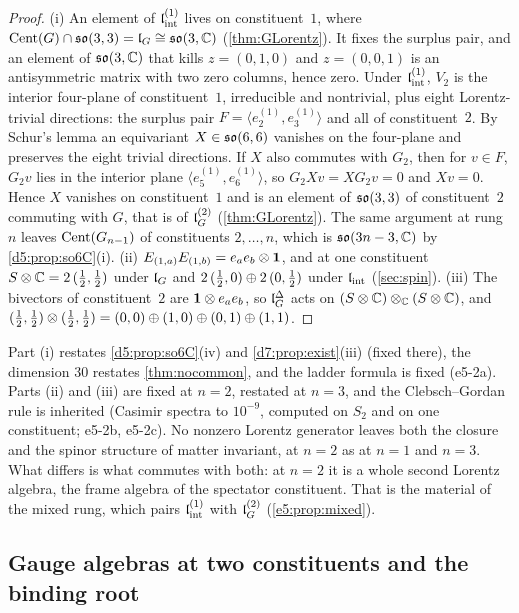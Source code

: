 \begin{proof}
(i) An element of $\mathfrak l_{\rm int}^{(1)}$ lives on constituent~$1$, where $\operatorname{Cent}(G)\cap\mathfrak{so}(3,3)=\mathfrak l_G\cong\mathfrak{so}(3,\mathbb{C})$ (\cref{thm:GLorentz}). It fixes the
surplus pair, and an element of $\mathfrak{so}(3,\mathbb{C})$ that kills $z=(0,1,0)$ and $z=(0,0,1)$ is an antisymmetric matrix with two zero columns, hence zero. Under
$\mathfrak l_{\rm int}^{(1)}$, $V_2$ is the interior four-plane of constituent~$1$, irreducible and nontrivial, plus eight Lorentz-trivial directions: the surplus
pair $F=\langle e^{(1)}_2,e^{(1)}_3\rangle$ and all of constituent~$2$. By Schur's lemma an equivariant $X\in\mathfrak{so}(6,6)$ vanishes on the four-plane
and preserves the eight trivial directions. If $X$ also commutes with $G_2$, then for $v\in F$, $G_2v$ lies in the interior plane
$\langle e^{(1)}_5,e^{(1)}_6\rangle$, so $G_2Xv=XG_2v=0$ and $Xv=0$. Hence $X$ vanishes on constituent~$1$ and is an element of $\mathfrak{so}(3,3)$ of
constituent~$2$ commuting with $G$, that is of $\mathfrak l_G^{(2)}$ (\cref{thm:GLorentz}). The same argument at rung $n$ leaves
$\operatorname{Cent}(G_{n-1})$ of constituents $2,\dots,n$, which is $\mathfrak{so}(3n-3,\mathbb{C})$ by \cref{d5:prop:so6C}(i). (ii) $E_{(1,a)}E_{(1,b)}=e_ae_b\otimes\mathbf 1$,
and at one constituent $S\otimes\mathbb{C}=2\,(\tfrac12,\tfrac12)$ under $\mathfrak l_G$ and $2\,(\tfrac12,0)\oplus2\,(0,\tfrac12)$ under $\mathfrak l_{\rm int}$ (\cref{sec:spin}).
(iii) The bivectors of constituent~$2$ are $\mathbf 1\otimes e_ae_b$, so $\mathfrak l_G^\Delta$ acts on $(S\otimes\mathbb{C})\otimes_{\mathbb{C}}(S\otimes\mathbb{C})$, and
$(\tfrac12,\tfrac12)\otimes(\tfrac12,\tfrac12)=(0,0)\oplus(1,0)\oplus(0,1)\oplus(1,1)$.
\end{proof}

Part (i) restates \cref{d5:prop:so6C}(iv) and \cref{d7:prop:exist}(iii) (fixed there), the dimension $30$ restates \cref{thm:nocommon}, and the ladder formula is fixed (e5-2a). Parts (ii) and (iii) are fixed at $n=2$, restated at $n=3$, and the Clebsch--Gordan rule is
inherited (Casimir spectra to $10^{-9}$, computed on $S_2$ and on one constituent; e5-2b, e5-2c). No nonzero Lorentz generator leaves both the
closure and the spinor structure of matter invariant, at $n=2$ as at $n=1$ and $n=3$. What differs is what commutes with both: at $n=2$ it is a
whole second Lorentz algebra, the frame algebra of the spectator constituent. That is the material of the mixed rung, which pairs $\mathfrak l_{\rm int}^{(1)}$ with
$\mathfrak l_G^{(2)}$ (\cref{e5:prop:mixed}).

\subsection{Gauge algebras at two constituents and the binding root}
\label{e5:sec:gauge}

